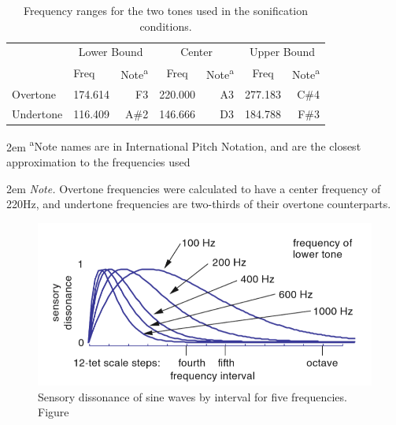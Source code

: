 \documentclass[10pt,a4paper,onecolumn]{article}
\begin{document}
\begin{table}[!h]

\begin{threeparttable}
\caption{\label{tab:frequency-ranges}Frequency ranges for the two tones used in the sonification conditions.}
\centering
\fontsize{7}{9}\selectfont
\begin{tabular}[t]{>{}l>{}l>{}r>{}c>{}r>{}c>{}r}
\toprule
\multicolumn{1}{c}{} & \multicolumn{2}{c}{Lower Bound} & \multicolumn{2}{c}{Center} & \multicolumn{2}{c}{Upper Bound} \\
\cmidrule(l{3pt}r{3pt}){2-3} \cmidrule(l{3pt}r{3pt}){4-5} \cmidrule(l{3pt}r{3pt}){6-7}
  & Freq & Note\textsuperscript{a} & Freq & Note\textsuperscript{a} & Freq & Note\textsuperscript{a}\\
\midrule
Overtone & 174.614 & F3 & 220.000 & A3 & 277.183 & C\#4\\
Undertone & 116.409 & A\#2 & 146.666 & D3 & 184.788 & F\#3\\
\bottomrule
\end{tabular}
\begin{tablenotes}
\small
\item [] 
\rightskip2em
{\footnotesize \sffamily \textsuperscript{a}Note names are in International Pitch Notation, and are the closest approximation to the frequencies used}
\item [] 
\rightskip2em
{\footnotesize \sffamily \textit{Note.} Overtone frequencies were calculated to have a center frequency of 220Hz, and undertone frequencies are two-thirds of their overtone counterparts.}
\end{tablenotes}
\end{threeparttable}
\end{table}



\begin{figure}[h]

{\centering \includegraphics[width=1\linewidth]{figures/setharesTuningTimbreSpectrum2010_p47} 

}

\caption{Sensory dissonance of sine waves by interval for five frequencies. Figure \autocite[p.~47]{setharesSoundSound2005}}\label{fig:sensory-dissonance}
\end{figure}
\end{document}

